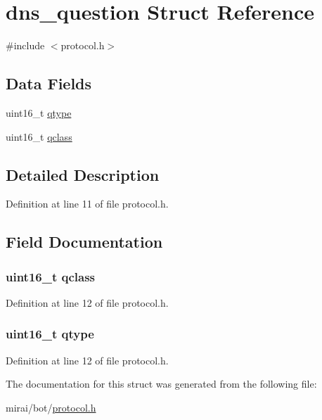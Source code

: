 \hypertarget{structdns__question}{}\section{dns\+\_\+question Struct Reference}
\label{structdns__question}


{\ttfamily \#include $<$protocol.\+h$>$}

\subsection*{Data Fields}
\begin{DoxyCompactItemize}
\item 
uint16\+\_\+t \hyperlink{structdns__question_a92ac313e0c65dcd831a91b495aa7b282}{qtype}
\item 
uint16\+\_\+t \hyperlink{structdns__question_ac94c665afc6c72c418f3caa344bc480e}{qclass}
\end{DoxyCompactItemize}


\subsection{Detailed Description}


Definition at line 11 of file protocol.\+h.



\subsection{Field Documentation}
\subsubsection[{\texorpdfstring{qclass}{qclass}}]{\setlength{\rightskip}{0pt plus 5cm}uint16\+\_\+t qclass}\hypertarget{structdns__question_ac94c665afc6c72c418f3caa344bc480e}{}\label{structdns__question_ac94c665afc6c72c418f3caa344bc480e}


Definition at line 12 of file protocol.\+h.

\subsubsection[{\texorpdfstring{qtype}{qtype}}]{\setlength{\rightskip}{0pt plus 5cm}uint16\+\_\+t qtype}\hypertarget{structdns__question_a92ac313e0c65dcd831a91b495aa7b282}{}\label{structdns__question_a92ac313e0c65dcd831a91b495aa7b282}


Definition at line 12 of file protocol.\+h.



The documentation for this struct was generated from the following file\+:\begin{DoxyCompactItemize}
\item 
mirai/bot/\hyperlink{protocol_8h}{protocol.\+h}\end{DoxyCompactItemize}
